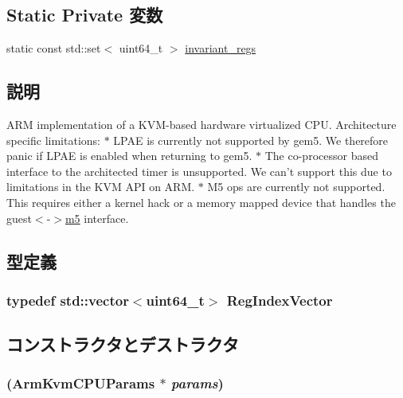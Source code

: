 \subsection*{Static Private 変数}
\begin{DoxyCompactItemize}
\item 
static const std::set$<$ uint64\_\-t $>$ \hyperlink{classArmKvmCPU_a0183ebe7a406948461e8b808c5a3677d}{invariant\_\-regs}
\end{DoxyCompactItemize}


\subsection{説明}
ARM implementation of a KVM-\/based hardware virtualized CPU. Architecture specific limitations: $\ast$ LPAE is currently not supported by gem5. We therefore panic if LPAE is enabled when returning to gem5. $\ast$ The co-\/processor based interface to the architected timer is unsupported. We can't support this due to limitations in the KVM API on ARM. $\ast$ M5 ops are currently not supported. This requires either a kernel hack or a memory mapped device that handles the guest$<$-\/$>$\hyperlink{namespacem5}{m5} interface. 

\subsection{型定義}
\hypertarget{classArmKvmCPU_acba61563c19ad813c8026d8746e8bded}{
\subsubsection[{RegIndexVector}]{\setlength{\rightskip}{0pt plus 5cm}typedef {\bf std::vector}$<$uint64\_\-t$>$ {\bf RegIndexVector}}}
\label{classArmKvmCPU_acba61563c19ad813c8026d8746e8bded}


\subsection{コンストラクタとデストラクタ}
\hypertarget{classArmKvmCPU_ab1eb352efa2b1da33f37cf592ffb2b00}{
\subsubsection[{ArmKvmCPU}]{ (ArmKvmCPUParams $\ast$ {\em params})}}
\label{classArmKvmCPU_ab1eb352efa2b1da33f37cf592ffb2b00}



